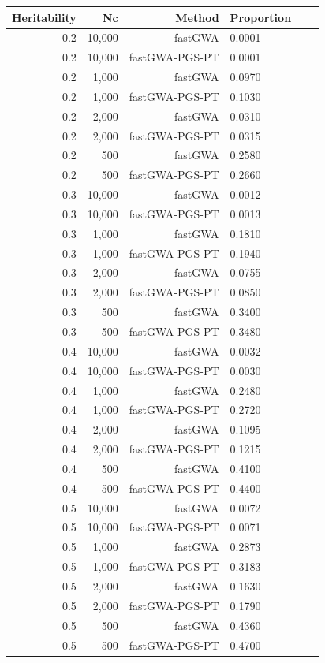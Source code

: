 \documentclass[10pt]{article}
\begin{document}
\begin{table}[!htb]
\centering
{}
\begin{tabular}{rrrlrr}
  \hline
 Heritability & Nc & Method & Proportion  \\ 
  \hline
0.2 & 10,000 & fastGWA & 0.0001  \\ 
  0.2 & 10,000 & fastGWA-PGS-PT & 0.0001  \\ 
  0.2 &  1,000 & fastGWA & 0.0970  \\ 
  0.2 &  1,000 & fastGWA-PGS-PT & 0.1030  \\ 
  0.2 &  2,000 & fastGWA & 0.0310  \\ 
  0.2 &  2,000 & fastGWA-PGS-PT & 0.0315 \\ 
  0.2 &   500 & fastGWA & 0.2580  \\ 
  0.2 &   500 & fastGWA-PGS-PT & 0.2660  \\ 
  0.3 & 10,000 & fastGWA & 0.0012  \\ 
  0.3 & 10,000 & fastGWA-PGS-PT & 0.0013  \\ 
  0.3 &  1,000 & fastGWA & 0.1810  \\ 
  0.3 &  1,000 & fastGWA-PGS-PT & 0.1940  \\ 
  0.3 &  2,000 & fastGWA & 0.0755  \\ 
  0.3 &  2,000 & fastGWA-PGS-PT & 0.0850  \\ 
  0.3 &   500 & fastGWA & 0.3400 \\ 
  0.3 &   500 & fastGWA-PGS-PT & 0.3480  \\ 
  0.4 & 10,000 & fastGWA & 0.0032  \\ 
  0.4 & 10,000 & fastGWA-PGS-PT & 0.0030  \\ 
  0.4 &  1,000 & fastGWA & 0.2480 \\ 
  0.4 &  1,000 & fastGWA-PGS-PT & 0.2720  \\ 
  0.4 &  2,000 & fastGWA & 0.1095  \\ 
  0.4 &  2,000 & fastGWA-PGS-PT & 0.1215  \\ 
  0.4 &   500 & fastGWA & 0.4100  \\ 
  0.4 &   500 & fastGWA-PGS-PT & 0.4400  \\ 
  0.5 & 10,000 & fastGWA & 0.0072  \\ 
  0.5 & 10,000 & fastGWA-PGS-PT & 0.0071  \\ 
  0.5 &  1,000 & fastGWA & 0.2873  \\ 
  0.5 &  1,000 & fastGWA-PGS-PT & 0.3183  \\ 
  0.5 &  2,000 & fastGWA & 0.1630  \\ 
  0.5 &  2,000 & fastGWA-PGS-PT & 0.1790  \\ 
  0.5 &   500 & fastGWA & 0.4360  \\ 
  0.5 &   500 & fastGWA-PGS-PT & 0.4700  \\ 
   \hline
\end{tabular}
\end{table}
\end{document}
